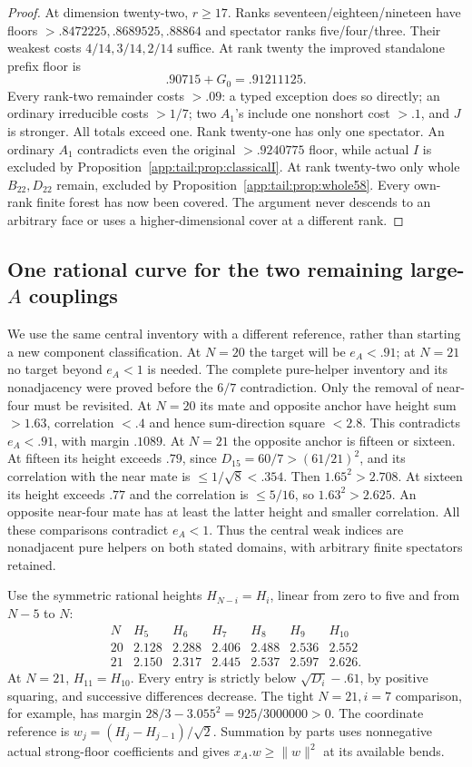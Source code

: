 \documentclass[11pt]{article}
\theoremstyle{definition}
\theoremstyle{remark}
\newcommand{\norm}[1]{\lVert #1\rVert}
\begin{document}
\begin{proof}
At dimension twenty-two, $r\ge17$. Ranks seventeen/eighteen/nineteen
have floors $>.8472225,.8689525,.88864$ and spectator ranks
five/four/three. Their weakest costs $4/14,3/14,2/14$ suffice.
At rank twenty the improved standalone prefix floor is
\[
 .90715+G_0=.91211125.
\]
Every rank-two remainder costs $>.09$: a typed exception does so
directly; an ordinary irreducible costs $>1/7$; two $A_1$'s include
one nonshort cost $>.1$, and $J$ is stronger. All totals exceed one.
Rank twenty-one has only one spectator. An ordinary $A_1$ contradicts
even the original $>.9240775$ floor, while actual $I$ is excluded
by Proposition~\ref{app:tail:prop:classicalI}. At rank twenty-two
only whole $B_{22},D_{22}$ remain, excluded by
Proposition~\ref{app:tail:prop:whole58}. Every own-rank finite forest
has now been covered. The argument never descends to an arbitrary
face or uses a higher-dimensional cover at a different rank.
\end{proof}

\subsection{One rational curve for the two remaining large-$A$ couplings}
\label{app:tail:Atwoends}
We use the same central inventory with a different reference, rather
than starting a new component classification. At $N=20$ the target
will be $e_A<.91$; at $N=21$ no target beyond $e_A<1$ is needed.
The complete pure-helper inventory and its nonadjacency were proved
before the $6/7$ contradiction. Only the removal of near-four must
be revisited. At $N=20$ its mate and opposite anchor have height
sum $>1.63$, correlation $<.4$ and hence sum-direction square
$<2.8$. This contradicts $e_A<.91$, with margin $.1089$.
At $N=21$ the opposite anchor is fifteen or sixteen. At fifteen its
height exceeds $.79$, since $D_{15}=60/7>(61/21)^2$, and its
correlation with the near mate is $\le1/\sqrt8<.354$.
Then $1.65^2>2.708$. At sixteen its height exceeds $.77$ and
the correlation is $\le5/16$, so $1.63^2>2.625$.
An opposite near-four mate has at least the latter height and smaller
correlation. All these comparisons contradict $e_A<1$.
Thus the central weak indices are nonadjacent pure helpers on both
stated domains, with arbitrary finite spectators retained.

Use the symmetric rational heights $H_{N-i}=H_i$, linear from
zero to five and from $N-5$ to $N$:
\[
\begin{array}{c|rrrrrr}
N&H_5&H_6&H_7&H_8&H_9&H_{10}\\\hline
20&2.128&2.288&2.406&2.488&2.536&2.552\\
21&2.150&2.317&2.445&2.537&2.597&2.626 .
\end{array}
\]
At $N=21$, $H_{11}=H_{10}$. Every entry is strictly below
$\sqrt{D_i}-.61$, by positive squaring, and successive differences
decrease. The tight $N=21,i=7$ comparison, for example, has
margin $28/3-3.055^2=925/3000000>0$.
The coordinate reference is $w_j=(H_j-H_{j-1})/\sqrt2$.
Summation by parts uses nonnegative actual strong-floor coefficients
and gives $x_A.w\ge\norm w^2$ at its available bends.
\end{document}
